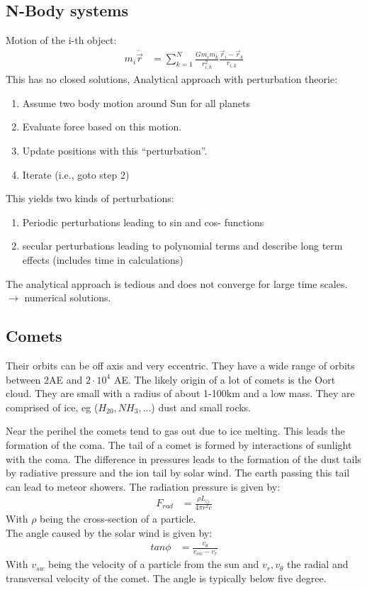\documentclass[11pt,a4paper]{article}
\begin{document}
\subsection{N-Body systems}
Motion of the i-th object:
\begin{align*}
    m_i \ddot \vec r &= \sum_{k=1}^N \frac{Gm_im_k}{r_{i,k}^2} \frac {\vec r_i - \vec r_k}{r_{i,k }}
\end{align*}
This has no closed solutions, Analytical approach with perturbation theorie:
\begin{enumerate}
    \item Assume two body motion around Sun for all planets
    \item Evaluate force based on this motion.
    \item Update positions with this “perturbation”.
    \item Iterate (i.e., goto step 2) 
\end{enumerate}
This yields two kinds of perturbations: 
 \begin{enumerate}
     \item Periodic perturbations leading to sin and cos- functions 
     \item secular perturbations leading to polynomial terms and describe long term effects (includes time in calculations)
 \end{enumerate}
 The analytical approach is tedious and does not converge for large time scales.\\ 
 $\rightarrow$ numerical solutions.
\subsection{Comets}
Their orbits can be off axis and very eccentric.
They have a wide range of orbits between 2AE and $2 \cdot 10 ^4 $ AE.
The likely origin of a lot of comets is the Oort cloud. 
They are small with a radius of about 1-100km and a low mass. 
They are comprised of ice, eg ($H_20, NH_3, ...$) dust and small rocks. 

Near the perihel the comets tend to gas out due to ice melting. 
This leads the formation of the coma. 
The tail of a comet is formed by interactions of sunlight with the coma.
The difference in pressures leads to the formation of the dust tails by radiative pressure and the ion tail by solar wind.
The earth passing this tail can lead to meteor showers. 
The radiation pressure is given by: 
\begin{align*}
    F_{rad} &= \frac {\rho L_{\odot}}{4 \pi r^2 c}
\end{align*}
With $\rho$ being the cross-section of a particle. \\
The angle caused by the solar wind is given by: 
\begin{align*}
    tan \phi &= \frac {v_\theta}{v_{sw} -v_r} 
\end{align*}
With $v_{sw}$ being the velocity of a particle from the sun and $v_r, v_\theta$ the radial and transversal velocity of the comet. 
The angle is typically below five degree. 
\end{document}
